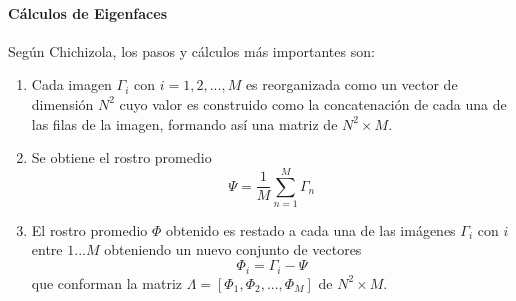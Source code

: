 \documentclass[letterpaper,12pt]{article}
\begin{document}
\paragraph{Cálculos de Eigenfaces}
Según Chichizola, \cite{EigenfaceEspa} los pasos y cálculos más importantes son:
\begin{enumerate}
\item Cada imagen $\Gamma_i$ con $i=1,2,...,M$ es reorganizada como un vector de dimensión $N^2$ cuyo valor es construido como la concatenación de cada una de las filas de la imagen, formando así una matriz de $N^2\times M$.

\item Se obtiene el rostro promedio 
\begin{equation}
\Psi=\frac{1}{M}\sum_{n=1}^{M}\Gamma_{n}
\end{equation}

\item El rostro promedio $\Phi$ obtenido es restado a cada una de las imágenes $\Gamma_{i}$ con $i$ entre $1...M$ obteniendo un nuevo conjunto de vectores\\
\begin{equation}
\Phi_{i}=\Gamma_{i}-\Psi
\end{equation}
que conforman la matriz $\Lambda=[\Phi_{1},\Phi_{2},...,\Phi_{M}]$ de $N^2\times M$.


\end{enumerate}
\end{document}
